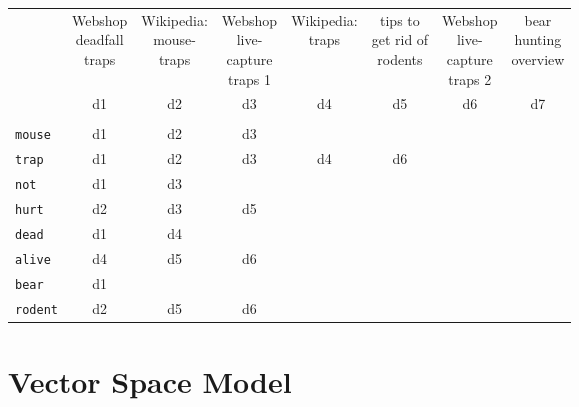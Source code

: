 \documentclass[a4paper, 11pt, accentcolor = tud3b]{tudreport}
\begin{document}
                	\begin{table}[H]
                		\centering
                		\begin{tabular}{|l|c|c|c|c|c|c|c|}
                			\cline{2-8}
            				\multicolumn{1}{c|}{} & \makecell{Webshop \\ deadfall \\ traps} & \makecell{Wikipedia: \\ mouse- \\ traps} & \makecell{Webshop \\ live- \\ capture \\ traps 1} & \makecell{Wikipedia: \\ traps} & \makecell{tips to \\ get rid of \\ rodents} & \makecell{Webshop \\ live- \\ capture \\ traps 2} & \makecell{bear \\ hunting \\ overview} \\ \cline{2-8}
            				\multicolumn{1}{c|}{} & d1 & d2 & d3 & d4 & d5 & d6 & d7 \\ \cline{2-8}
            				\multicolumn{8}{c}{} \\ \cline{1-4}
	            			\texttt{mouse} & d1 & d2 & d3 & \multicolumn{4}{c}{} \\ \cline{1-6}
							\texttt{trap} & d1 & d2 & d3 & d4 & d6 & \multicolumn{2}{c}{} \\ \cline{1-6}
							\texttt{not} & d1 & d3 & \multicolumn{5}{c}{} \\ \cline{1-4}
							\texttt{hurt} & d2 & d3 & d5 & \multicolumn{4}{c}{} \\ \cline{1-4}
							\texttt{dead} & d1 & d4 & \multicolumn{5}{c}{} \\ \cline{1-4}
							\texttt{alive} & d4 & d5 & d6 & \multicolumn{4}{c}{} \\ \cline{1-4}
							\texttt{bear} & d1 & \multicolumn{6}{c}{} \\ \cline{1-4}
							\texttt{rodent} & d2 & d5 & d6 & \multicolumn{4}{c}{} \\ \cline{1-4}
                		\end{tabular}
                	\end{table}

        \section{Vector Space Model} %
\end{document}
